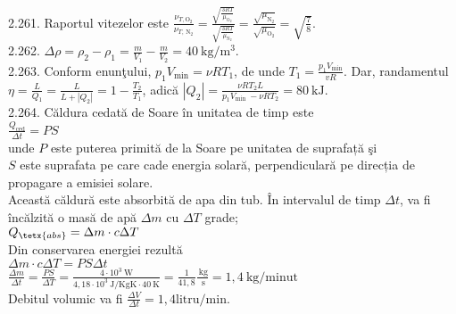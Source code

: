 2.261. Raportul vitezelor este $\frac{\nu_{T, \mathrm{O}_{2}}}{\nu_{T, \mathrm{~N}_{2}}}=\frac{\sqrt{\frac{3 R T}{\mu_{\mathrm{O}_{2}}}}}{\sqrt{\frac{3 R T}{\mu_{\mathrm{N}_{2}}}}}=\frac{\sqrt{\mu_{\mathrm{N}_{2}}}}{\sqrt{\mu_{\mathrm{O}_{2}}}}=\sqrt{\frac{7}{8}}$.\\

2.262. $\Delta \rho=\rho_{2}-\rho_{1}=\frac{m}{V_{1}}-\frac{m}{V_{2}}=40 \mathrm{~kg} / \mathrm{m}^{3}$.\\

2.263. Conform enunţului, $p_{1} V_{\min }=\nu R T_{1}$, de unde $T_{1}=\frac{p_{1} V_{\min }}{v R}$. Dar, randamentul $\eta=\frac{L}{Q_{1}}=\frac{L}{L+\left|Q_{2}\right|}=1-\frac{T_{2}}{T_{1}}$, adică $\left|Q_{2}\right|=\frac{\nu R T_{2} L}{p_{1} V_{\text {min }}-\nu R T_{2}}=80 \mathrm{~kJ}$.\\

2.264. Căldura cedată de Soare în unitatea de timp este\\ $\frac{Q_{\text{ced}}}{\Delta t}=P S$\\ unde $P$ este puterea primită de la Soare pe unitatea de suprafață şi\\ $S$ este suprafata pe care cade energia solară, perpendiculară pe direcția de propagare a emisiei solare.\\ Această căldură este absorbită de apa din tub. În intervalul de timp $\Delta t$, va fi încălzită o masă de apă $\Delta m$ cu $\Delta T$ grade;\\ $Q_{\tetx{abs}}=\Delta m \cdot c \Delta T$\\ Din conservarea energiei rezultă\\ $\Delta m \cdot c \Delta T=P S \Delta t$\\ $\frac{\Delta m}{\Delta t}=\frac{P S}{\Delta T}=\frac{4 \cdot 10^{3} \mathrm{~W}}{4,18 \cdot 10^{3} \mathrm{~J} / \mathrm{KgK} \cdot 40 \mathrm{~K}}=\frac{1}{41,8} \frac{\mathrm{~kg}}{\mathrm{~s}}=1,4 \mathrm{~kg} / \mathrm{minut}$\\ Debitul volumic va fi $\frac{\Delta V}{\Delta t}=1,4 \mathrm{litru} / \mathrm{min}$.\\ 

